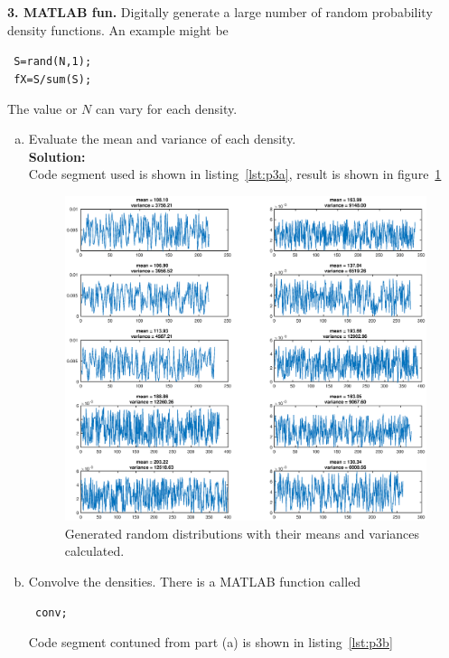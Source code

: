 \textbf{3. MATLAB fun.} Digitally generate a large number of random probability density functions. An example might be\\
\begin{center}
  \texttt{    S=rand(N,1);}  \\
  \texttt{    fX=S/sum(S);} \\
\end{center}
The value or $N$ can vary for each density.
\begin{enumerate}[(a)]
\item  Evaluate the mean and variance of each density.\\
  \textbf{Solution:}\\
  Code segment used is shown in listing~\ref{lst:p3a}, result is shown in figure~\ref{fig:p3a}
  \begin{figure}[!h]
    \begin{center}
      \includegraphics[width=6in]{random_distributions.eps}
    \end{center}
    \caption{Generated random distributions with their means and variances calculated.}
    \label{fig:p3a}
  \end{figure}

\item  Convolve the densities. There is a MATLAB function called \\
  \begin{center}
    \texttt{    conv;}    \\
  \end{center}
  Code segment contuned from part (a) is shown in listing~\ref{lst:p3b}


\end{enumerate}
